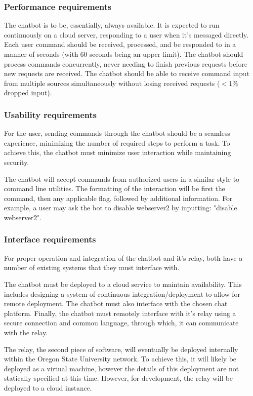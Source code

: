 \subsubsection{Performance requirements}
The chatbot is to be, essentially, always available.
It is expected to run continuously on a cloud server, responding to a user when it's messaged directly.
Each user command should be received, processed, and be responded to in a manner of seconds (with 60 seconds being an upper limit).
The chatbot should process commands concurrently, never needing to finish previous requests before new requests are received.
The chatbot should be able to receive command input from multiple sources simultaneously without losing received requests ($<$1\% dropped input). 

\subsubsection{Usability requirements}
For the user, sending commands through the chatbot should be a seamless experience, minimizing the number of required steps to perform a task.
To achieve this, the chatbot must minimize user interaction while maintaining security.

The chatbot will accept commands from authorized users in a similar style to command line utilities.
The formatting of the interaction will be first the command, then any applicable flag, followed by additional information.
For example, a user may ask the bot to disable webserver2 by inputting: "disable webserver2".

\subsubsection{Interface requirements}
For proper operation and integration of the chatbot and it's relay, both have a number of existing systems that they must interface with.

The chatbot must be deployed to a cloud service to maintain availability. 
This includes designing a system of continuous integration/deployment to allow for remote deployment.
The chatbot must also interface with the chosen chat platform.
Finally, the chatbot must remotely interface with it's relay using a secure connection and common language, through which, it can communicate with the relay.

The relay, the second piece of software, will eventually be deployed internally within the Oregon State University network.
To achieve this, it will likely be deployed as a virtual machine, however the details of this deployment are not statically specified at this time.
However, for development, the relay will be deployed to a cloud instance.

